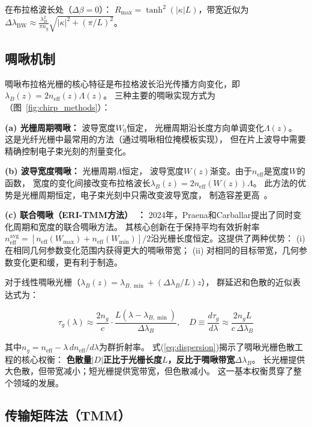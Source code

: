 \documentclass[12pt,a4paper,twoside]{article}
\begin{document}
在布拉格波长处（$\Delta\beta = 0$）：
$R_{\max} = \tanh^2(|\kappa|L)$，带宽近似为
$\Delta\lambda_{\text{BW}} \approx \frac{\lambda_B^2}{\pi n_g}
\sqrt{|\kappa|^2 + (\pi/L)^2}$。

\subsection{啁啾机制}

啁啾布拉格光栅的核心特征是布拉格波长沿光传播方向变化，即
$\lambda_B(z) = 2n_{\text{eff}}(z) \Lambda(z)$。
三种主要的啁啾实现方式为（图~\ref{fig:chirp_methods}）：

\textbf{(a) 光栅周期啁啾：} 波导宽度$W_0$恒定，
光栅周期沿长度方向单调变化$\Lambda(z)$。
这是光纤光栅中最常用的方法（通过啁啾相位掩模板实现），
但在片上波导中需要精确控制电子束光刻的剂量变化。

\textbf{(b) 波导宽度啁啾：} 光栅周期$\Lambda$恒定，
波导宽度$W(z)$渐变。由于$n_{\text{eff}}$是宽度$W$的函数，
宽度的变化间接改变布拉格波长$\lambda_B(z) = 2n_{\text{eff}}(W(z))\Lambda$。
此方法的优势是光栅周期恒定，电子束光刻中只需改变波导宽度，
制造容差更高~\cite{shi2014}。

\textbf{(c) 联合啁啾（ERI-TMM方法）~\cite{praena2024}：}
2024年，Praena和Carballar提出了同时变化周期和宽度的联合啁啾方法。
其核心创新在于保持平均有效折射率$n_{\text{eff}}^{\text{avg}} = [n_{\text{eff}}(W_{\max})
+ n_{\text{eff}}(W_{\min})]/2$沿光栅长度恒定。这提供了两种优势：
(i) 在相同几何参数变化范围内获得更大的啁啾带宽；
(ii) 对相同的目标带宽，几何参数变化更和缓，更有利于制造。

对于线性啁啾光栅（$\lambda_B(z) = \lambda_{B,\min} + (\Delta\lambda_B/L)z$），
群延迟和色散的近似表达式为：

\begin{equation}
\tau_g(\lambda) \approx \frac{2n_g}{c} \cdot \frac{L(\lambda - \lambda_{B,\min})}
                                            {\Delta\lambda_B},
\quad D \equiv \frac{d\tau_g}{d\lambda} \approx \frac{2n_g L}{c\,\Delta\lambda_B}
\label{eq:dispersion}
\end{equation}

其中$n_g = n_{\text{eff}} - \lambda\,dn_{\text{eff}}/d\lambda$为群折射率。
式(\ref{eq:dispersion})揭示了啁啾光栅色散工程的核心权衡：
\textbf{色散量$|D|$正比于光栅长度$L$，反比于啁啾带宽$\Delta\lambda_B$}。
长光栅提供大色散，但带宽减小；短光栅提供宽带宽，但色散减小。
这一基本权衡贯穿了整个领域的发展。

\subsection{传输矩阵法（TMM）}
\end{document}
